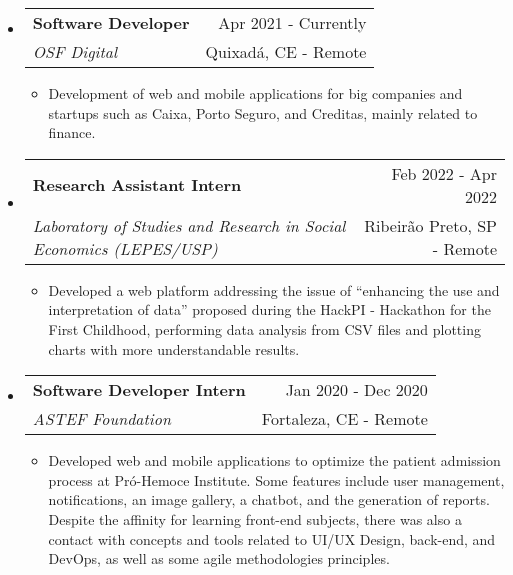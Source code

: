 \documentclass[letterpaper,11pt]{article}
\makeatletter
\newcommand{\resumeSubheading}[4]{
    \vspace{-1pt}\item
        \begin{tabular*}{0.97\textwidth}{l@{\extracolsep{\fill}}r}
            \textbf{#1} & #2 \\
            \textit{\small#3} & \small #4 \\
        \end{tabular*}
    \vspace{-5pt}
}
\newcommand{\resumeSubHeadingListStart}{\begin{itemize}[leftmargin=*]}
\newcommand{\resumeSubHeadingListEnd}{\end{itemize}}
\makeatother
\begin{document}
    \resumeSubHeadingListStart
        \resumeSubheading
        {Software Developer}{\faCalendar \hspace{0.1cm} Apr 2021 - Currently}
        {OSF Digital}{\faMapMarker \hspace{0.1cm} Quixadá, CE - Remote}
        \begin{itemize}
            \item Development of web and mobile applications for big companies and startups such as Caixa, Porto Seguro, and Creditas, mainly related to finance.
        \end{itemize}
    \resumeSubHeadingListEnd
    
    \vspace{-0.2cm}
    
    \resumeSubHeadingListStart
        \resumeSubheading
        {Research Assistant Intern}{\faCalendar \hspace{0.1cm} Feb 2022 - Apr 2022}
        {Laboratory of Studies and Research in Social Economics (LEPES/USP)}{\faMapMarker \hspace{0.1cm} Ribeirão Preto, SP - Remote}
        
        \begin{itemize}
            \item Developed a web platform addressing the issue of ``enhancing the use and interpretation of data'' proposed during the HackPI - Hackathon for the First Childhood, performing data analysis from CSV files and plotting charts with more understandable results.
        \end{itemize}
    \resumeSubHeadingListEnd
    
    \vspace{-0.2cm}

    \resumeSubHeadingListStart
        \resumeSubheading
        {Software Developer Intern}{\faCalendar \hspace{0.1cm} Jan 2020 - Dec 2020}
        {ASTEF Foundation}{\faMapMarker \hspace{0.1cm} Fortaleza, CE - Remote}
        
        \begin{itemize}
            \item Developed web and mobile applications to optimize the patient admission process at Pró-Hemoce Institute. Some features include user management, notifications, an image gallery, a chatbot, and the generation of reports. Despite the affinity for learning front-end subjects, there was also a contact with concepts and tools related to UI/UX Design, back-end, and DevOps, as well as some agile methodologies principles.
            \vspace{0.6cm} %
        \end{itemize}
    \resumeSubHeadingListEnd
\end{document}
